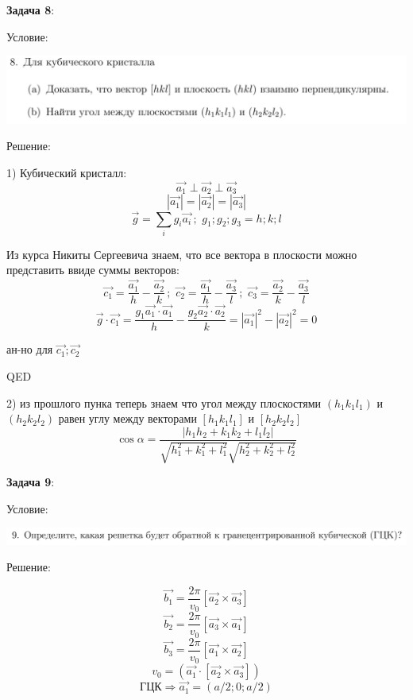 \documentclass[12pt]{article}
\begin{document}
\begin{large}
\par \textbf{Задача 8}:
\par Условие:
\par
\includegraphics[width=1\textwidth]{photo_8.png}
\par Решение:
\par 1) Кубический кристалл:
\[
    \vec{a_1} \perp \vec{a_2} \perp \vec{a_3}
\]
\[
    |\vec{a_1}| = |\vec{a_2}| = |\vec{a_3}|
\]
\[
    \vec{g} = \sum_{i} g_i \vec{a_i} \,; \,\, g_1; g_2; g_3 = h; k; l
\]
\par Из курса Никиты Сергеевича знаем, что все вектора в плоскости можно представить ввиде суммы векторов:
\[
    \vec{c_1} = \frac{\vec{a_1}}{h} - \frac{\vec{a_2}}{k} \, ; \,\, \vec{c_2} = \frac{\vec{a_1}}{h} - \frac{\vec{a_3}}{l} \, ; \,\, \vec{c_3} = \frac{\vec{a_2}}{k} - \frac{\vec{a_3}}{l}
\]
\[
    \vec{g} \cdot \vec{c_1} = \frac{g_1 \vec{a_1}\cdot\vec{a_1}}{h} -  \frac{g_2 \vec{a_2}\cdot\vec{a_2}}{k} = |\vec{a_1}|^2 - |\vec{a_2}|^2 = 0
\]
\par ан-но для $\vec{c_1}; \vec{c_2}$
\par QED
\par 2) из прошлого пунка теперь знаем что угол между плоскостями $(h_1 k_1 l_1)$ и $(h_2 k_2 l_2)$ равен углу между векторами $[h_1 k_1 l_1]$ и $[h_2 k_2 l_2]$
\[
    \cos \alpha = \frac{|h_1 h_2 + k_1 k_2 + l_1 l_2|}{\sqrt{h_1^2 + k_1^2 + l_1^2} \sqrt{h_2^2 + k_2^2 + l_2^2}}
\]
\par
\par \textbf{Задача 9}:
\par Условие:
\par
\includegraphics[width=1\textwidth]{photo_9.png}
\par Решение:
\par
\[
    \vec{b_1} = \frac{2\pi}{v_0} \left[ \vec{a_2} \times \vec{a_3} \right]
\]
\[
    \vec{b_2} = \frac{2\pi}{v_0} \left[ \vec{a_3} \times \vec{a_1} \right]
\]
\[
    \vec{b_3} = \frac{2\pi}{v_0} \left[ \vec{a_1} \times \vec{a_2} \right]
\]
\[
    v_0 = (\vec{a_1} \cdot \left[ \vec{a_2} \times \vec{a_3} \right])
\]
\[
    \text{ГЦК} \Rightarrow \vec{a_1} = \left( a/2; 0; a/2 \right)
\]

\end{large}
\end{document}
